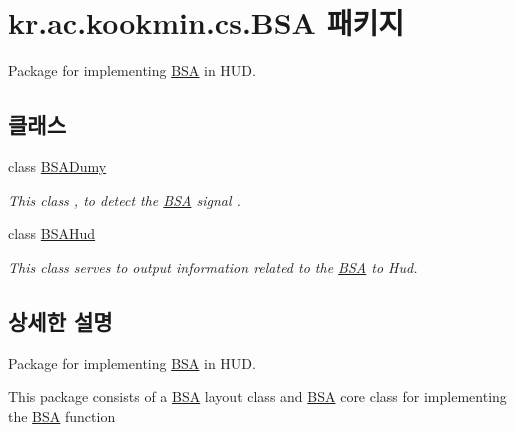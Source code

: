 \hypertarget{namespacekr_1_1ac_1_1kookmin_1_1cs_1_1_b_s_a}{}\section{kr.\+ac.\+kookmin.\+cs.\+B\+S\+A 패키지}
\label{namespacekr_1_1ac_1_1kookmin_1_1cs_1_1_b_s_a}


Package for implementing \hyperlink{namespacekr_1_1ac_1_1kookmin_1_1cs_1_1_b_s_a}{B\+S\+A} in H\+U\+D.  


\subsection*{클래스}
\begin{DoxyCompactItemize}
\item 
class \hyperlink{classkr_1_1ac_1_1kookmin_1_1cs_1_1_b_s_a_1_1_b_s_a_dumy}{B\+S\+A\+Dumy}
\begin{DoxyCompactList}\small\item\em This class , to detect the \hyperlink{namespacekr_1_1ac_1_1kookmin_1_1cs_1_1_b_s_a}{B\+S\+A} signal . \end{DoxyCompactList}\item 
class \hyperlink{classkr_1_1ac_1_1kookmin_1_1cs_1_1_b_s_a_1_1_b_s_a_hud}{B\+S\+A\+Hud}
\begin{DoxyCompactList}\small\item\em This class serves to output information related to the \hyperlink{namespacekr_1_1ac_1_1kookmin_1_1cs_1_1_b_s_a}{B\+S\+A} to Hud. \end{DoxyCompactList}\end{DoxyCompactItemize}


\subsection{상세한 설명}
Package for implementing \hyperlink{namespacekr_1_1ac_1_1kookmin_1_1cs_1_1_b_s_a}{B\+S\+A} in H\+U\+D. 

This package consists of a \hyperlink{namespacekr_1_1ac_1_1kookmin_1_1cs_1_1_b_s_a}{B\+S\+A} layout class and \hyperlink{namespacekr_1_1ac_1_1kookmin_1_1cs_1_1_b_s_a}{B\+S\+A} core class for implementing the \hyperlink{namespacekr_1_1ac_1_1kookmin_1_1cs_1_1_b_s_a}{B\+S\+A} function 